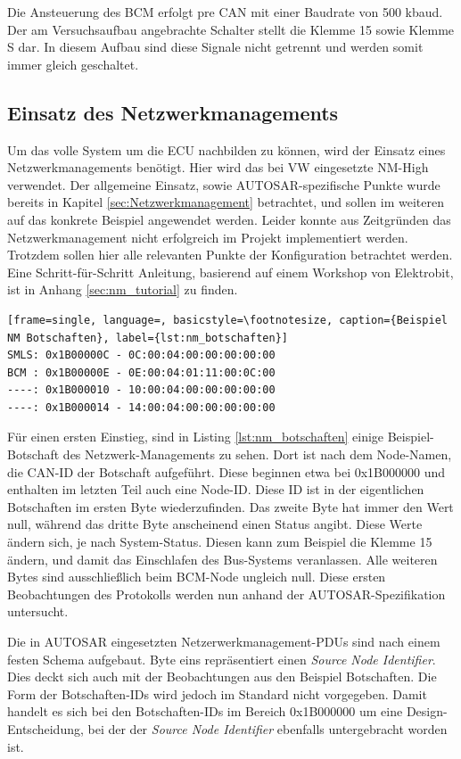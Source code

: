 \documentclass[
  a4paper,					    %
  twoside,
  DIV=calc,     				%
  bibliography=totoc,
  cleardoublepage=empty,
  ngerman,     					%
  final       					%
]{scrbook}
\begin{document}
Die Ansteuerung des BCM erfolgt pre CAN mit einer Baudrate von 500 kbaud. Der am Versuchsaufbau angebrachte Schalter stellt die Klemme 15 sowie Klemme S dar. In diesem Aufbau sind diese Signale nicht getrennt und werden somit immer gleich geschaltet.




\subsection{Einsatz des Netzwerkmanagements}
\label{sec:AutosarNM}
Um das volle System um die ECU nachbilden zu können, wird der Einsatz eines Netzwerkmanagements benötigt. Hier wird das bei VW eingesetzte NM-High verwendet. Der allgemeine Einsatz, sowie AUTOSAR-spezifische Punkte wurde bereits in Kapitel \ref{sec:Netzwerkmanagement} betrachtet, und sollen im weiteren auf das konkrete Beispiel angewendet werden. Leider konnte aus Zeitgründen das Netzwerkmanagement nicht erfolgreich im Projekt implementiert werden. Trotzdem sollen hier alle relevanten Punkte der Konfiguration betrachtet werden. Eine Schritt-für-Schritt Anleitung, basierend auf einem Workshop von Elektrobit, ist in Anhang \ref{sec:nm_tutorial} zu finden.

\begin{lstlisting}[frame=single, language=, basicstyle=\footnotesize, caption={Beispiel NM Botschaften}, label={lst:nm_botschaften}]
SMLS: 0x1B00000C - 0C:00:04:00:00:00:00:00
BCM : 0x1B00000E - 0E:00:04:01:11:00:0C:00
----: 0x1B000010 - 10:00:04:00:00:00:00:00
----: 0x1B000014 - 14:00:04:00:00:00:00:00
\end{lstlisting}

Für einen ersten Einstieg, sind in Listing \ref{lst:nm_botschaften} einige Beispiel-Botschaft des Netzwerk-Managements zu sehen. Dort ist nach dem Node-Namen, die CAN-ID der Botschaft aufgeführt. Diese beginnen etwa bei 0x1B000000 und enthalten im letzten Teil auch eine Node-ID. Diese ID ist in der eigentlichen Botschaften im ersten Byte wiederzufinden. Das zweite Byte hat immer den Wert null, während das dritte Byte anscheinend einen Status angibt. Diese Werte ändern sich, je nach System-Status. Diesen kann zum Beispiel die Klemme 15 ändern, und damit das Einschlafen des Bus-Systems veranlassen. Alle weiteren Bytes sind ausschließlich beim BCM-Node ungleich null. Diese ersten Beobachtungen des Protokolls werden nun anhand der AUTOSAR-Spezifikation untersucht.

Die in AUTOSAR eingesetzten Netzerwerkmanagement-PDUs sind nach einem festen Schema aufgebaut.\cite[Seite 51]{autosar_cannm} Byte eins repräsentiert einen \emph{Source Node Identifier}. Dies deckt sich auch mit der Beobachtungen aus den Beispiel Botschaften. Die Form der Botschaften-IDs wird jedoch im Standard nicht vorgegeben. Damit handelt es sich bei den Botschaften-IDs im Bereich 0x1B000000 um eine Design-Entscheidung, bei der der \emph{Source Node Identifier} ebenfalls untergebracht worden ist.
\end{document}
